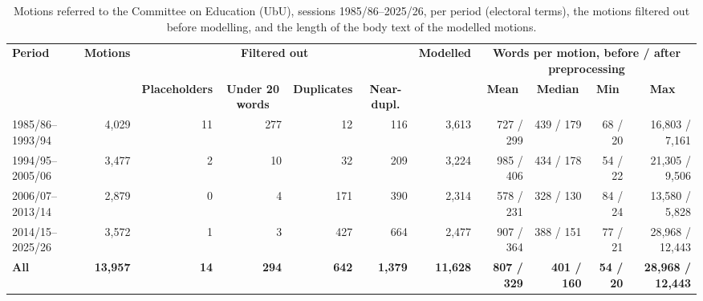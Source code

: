 
\begin{landscape}
\begin{table}
\centering
\small
\setlength{\tabcolsep}{3pt}
\renewcommand{\arraystretch}{1.3}
\begin{tabular}{|l|r|r|r|r|r|r|r|r|r|r|}
\hline
\textbf{Period} & \textbf{Motions} & \multicolumn{4}{c|}{\textbf{Filtered out}} & \textbf{Modelled}
  & \multicolumn{4}{c|}{\textbf{Words per motion, before / after preprocessing}} \\
\cline{3-6} \cline{8-11}
 & & \multicolumn{1}{c|}{\textbf{Placeholders}} & \multicolumn{1}{c|}{\textbf{Under 20 words}}
  & \multicolumn{1}{c|}{\textbf{Duplicates}} & \multicolumn{1}{c|}{\textbf{Near-dupl.}} & & \multicolumn{1}{c|}{\textbf{Mean}} & \multicolumn{1}{c|}{\textbf{Median}}
  & \multicolumn{1}{c|}{\textbf{Min}} & \multicolumn{1}{c|}{\textbf{Max}} \\
\hline
1985/86--1993/94 & 4,029 & 11 & 277 & 12 & 116 & 3,613 & 727 / 299 & 439 / 179 & 68 / 20 & 16,803 / 7,161 \\
1994/95--2005/06 & 3,477 & 2 & 10 & 32 & 209 & 3,224 & 985 / 406 & 434 / 178 & 54 / 22 & 21,305 / 9,506 \\
2006/07--2013/14 & 2,879 & 0 & 4 & 171 & 390 & 2,314 & 578 / 231 & 328 / 130 & 84 / 24 & 13,580 / 5,828 \\
2014/15--2025/26 & 3,572 & 1 & 3 & 427 & 664 & 2,477 & 907 / 364 & 388 / 151 & 77 / 21 & 28,968 / 12,443 \\
\hline
\textbf{All} & \textbf{13,957} & \textbf{14} & \textbf{294} & \textbf{642} & \textbf{1,379} & \textbf{11,628} & \textbf{807 / 329}
  & \textbf{401 / 160} & \textbf{54 / 20} & \textbf{28,968 / 12,443} \\
\hline
\end{tabular}
\caption{Motions referred to the Committee on Education (UbU), sessions 1985/86--2025/26, per period (electoral
terms), the motions filtered out before modelling, and the length of the body text of the modelled motions.
}
\end{table}
\end{landscape}
